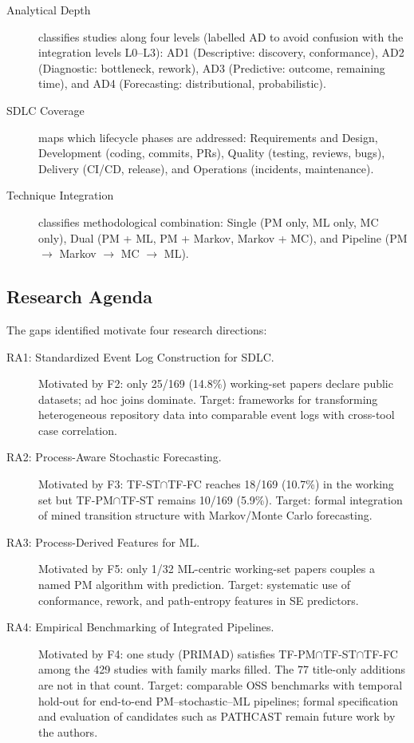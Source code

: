 \begin{description}
\item[Analytical Depth] classifies studies along four levels (labelled AD
  to avoid confusion with the integration levels L0--L3): AD1
  (Descriptive: discovery, conformance), AD2 (Diagnostic: bottleneck, rework),
  AD3 (Predictive: outcome, remaining time), and AD4 (Forecasting:
  distributional, probabilistic).

\item[SDLC Coverage] maps which lifecycle phases are addressed: Requirements
  and Design, Development (coding, commits, PRs), Quality (testing, reviews,
  bugs), Delivery (CI/CD, release), and Operations (incidents, maintenance).

\item[Technique Integration] classifies methodological combination:
  Single (PM only, ML only, MC only), Dual (PM + ML, PM + Markov, Markov + MC),
  and Pipeline (PM $\rightarrow$ Markov $\rightarrow$ MC $\rightarrow$ ML).
\end{description}


\subsection{Research Agenda}
\label{sec:slr-agenda}

The gaps identified motivate four research directions:

\begin{description}
\item[RA1: Standardized Event Log Construction for SDLC.]
  Motivated by F2: only 25/169 (14.8\%) working-set papers declare public
  datasets; ad hoc joins dominate. Target: frameworks for transforming
  heterogeneous repository data into comparable event logs with cross-tool
  case correlation.

\item[RA2: Process-Aware Stochastic Forecasting.]
  Motivated by F3: TF-ST$\cap$TF-FC reaches 18/169 (10.7\%) in the working set
  but TF-PM$\cap$TF-ST remains 10/169 (5.9\%). Target: formal integration of
  mined transition structure with Markov/Monte Carlo forecasting.

\item[RA3: Process-Derived Features for ML.]
  Motivated by F5: only 1/32 ML-centric working-set papers couples a named PM
  algorithm with prediction. Target: systematic use of conformance, rework,
  and path-entropy features in SE predictors.

\item[RA4: Empirical Benchmarking of Integrated Pipelines.]
  Motivated by F4: one study (PRIMAD) satisfies
  TF-PM$\cap$TF-ST$\cap$TF-FC among the 429 studies with family marks filled.
  The 77 title-only additions are not in that count. Target: comparable OSS
  benchmarks with temporal hold-out for end-to-end PM--stochastic--ML
  pipelines; formal specification and evaluation of candidates such as
  PATHCAST remain future work by the authors.
\end{description}


